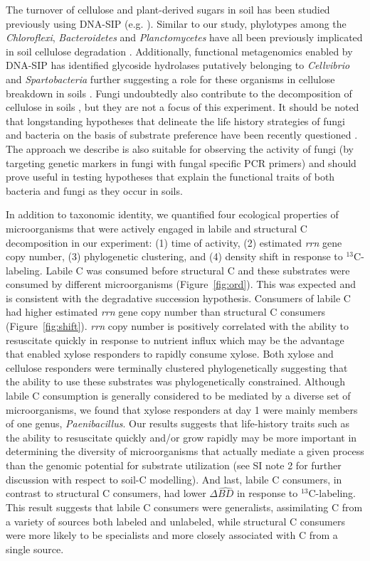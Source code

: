 The turnover of cellulose and plant-derived sugars in soil has been studied
previously using DNA-SIP (e.g. \citep{Verastegui_2014}). Similar to our study,
phylotypes among the \textit{Chloroflexi}, \textit{Bacteroidetes} and
\textit{Planctomycetes} have all been previously implicated in soil cellulose
degradation \citep{Schellenberger_2010}. Additionally, functional metagenomics
enabled by DNA-SIP has identified glycoside hydrolases putatively belonging
to \textit{Cellvibrio} and \textit{Spartobacteria} further suggesting a role
for these organisms in cellulose breakdown in soils \citep{Verastegui_2014}.
Fungi undoubtedly also contribute to the decomposition of cellulose in soils
\citep{boer_2005}, but they are not a focus of this experiment. It should be
noted that longstanding hypotheses that delineate the life history strategies
of fungi and bacteria on the basis of substrate preference have been recently
questioned \citep{rousk_2015}. The approach we describe is also suitable for
observing the activity of fungi (by targeting genetic markers in fungi with
fungal specific PCR primers) and should prove useful in testing hypotheses
that explain the functional traits of both bacteria and fungi as they occur in
soils.

In addition to taxonomic identity, we quantified four ecological properties of
microorganisms that were actively engaged in labile and structural C
decomposition in our experiment: (1) time of activity, (2) estimated
\textit{rrn} gene copy number, (3) phylogenetic clustering, and (4) density
shift in response to $^{13}$C-labeling. Labile C was consumed before structural C and 
these substrates were consumed by different microorganisms
(Figure~\ref{fig:ord}). This was expected and is consistent with the
degradative succession hypothesis. Consumers of
labile C had higher estimated \textit{rrn}
gene copy number than structural C consumers (Figure~\ref{fig:shift}).  \textit{rrn} copy number is
positively correlated with the ability to resuscitate quickly in response to
nutrient influx \citep{Klappenbach_2000} which may be the advantage that
enabled xylose responders to rapidly consume xylose. Both xylose and cellulose
responders were terminally clustered phylogenetically suggesting that the ability
to use these substrates was phylogenetically constrained. Although labile C
consumption is generally considered to be mediated by a diverse set of 
microorganisms, we found that xylose responders at day 1 were mainly members of
one genus, \textit{Paenibacillus}. Our results suggests that life-history
traits such as the ability to resuscitate
quickly and/or grow rapidly may be more important in determining the
diversity of microorganisms that actually mediate a given process than the genomic
potential for substrate utilization (see SI note 2 for further discussion with respect to
soil-C modelling). And last, labile C consumers, in contrast to structural C consumers, 
had lower $\Delta\hat{BD}$ in response to $^{13}$C-labeling.
This result suggests that labile C consumers were generalists, assimilating C
from a variety of sources both labeled and unlabeled, while structural C
consumers were more likely to be specialists and more closely associated
with C from a single source.

